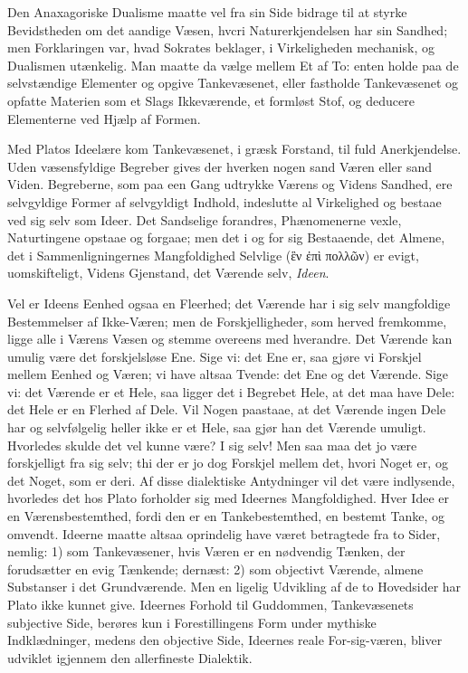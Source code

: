 \documentclass[12pt,a4paper]{book}
\begin{document}
Den Anaxagoriske Dualisme maatte vel fra sin Side bidrage til at styrke
Bevidstheden om det aandige Væsen, hvcri Naturerkjendelsen har sin Sandhed;
men Forklaringen var, hvad Sokrates beklager, i Virkeligheden mechanisk, og
Dualismen utænkelig. Man maatte da vælge mellem Et af To: enten holde paa de
selvstændige Elementer og opgive Tankevæsenet, eller fastholde Tankevæsenet og
opfatte Materien som et Slags Ikkeværende, et formløst Stof, og deducere
Elementerne ved Hjælp af Formen.

Med Platos Ideelære kom Tankevæsenet, i græsk Forstand, til fuld
Anerkjendelse. Uden væsensfyldige Begreber gives der hverken nogen sand Væren
eller sand Viden. Begreberne, som paa een Gang udtrykke Værens og Videns
Sandhed, ere selvgyldige Former af selvgyldigt Indhold, indeslutte al
Virkelighed og bestaae ved sig selv som Ideer. Det Sandselige forandres,
Phænomenerne vexle, Naturtingene opstaae og forgaae; men det i og for sig
Bestaaende, det Almene, det i Sammenligningernes Mangfoldighed Selvlige
(ἓν ἐπὶ πολλῶν) er evigt, uomskifteligt, Videns Gjenstand, det Værende selv,
\emph{Ideen}.

Vel er Ideens Eenhed ogsaa en Fleerhed; det Værende har i sig selv
mangfoldige Bestemmelser af Ikke-Væren; men de Forskjelligheder, som herved
fremkomme, ligge alle i Værens Væsen og stemme overeens med hverandre. Det
Værende kan umulig være det forskjelsløse Ene. Sige vi: det Ene er, saa gjøre
vi Forskjel mellem Eenhed og Væren; vi have altsaa Tvende: det Ene og det
Værende. Sige vi: det Værende er et Hele, saa ligger det i Begrebet Hele, at
det maa have Dele: det Hele er en Flerhed af Dele. Vil Nogen paastaae, at det
Værende ingen Dele har og selvfølgelig heller ikke er et Hele, saa gjør han
det Værende umuligt. Hvorledes skulde det vel kunne være? I sig selv! Men saa
maa det jo være forskjelligt fra sig selv; thi der er jo dog Forskjel mellem
det, hvori Noget er, og det Noget, som er deri. Af disse dialektiske
Antydninger vil det være indlysende, hvorledes det hos Plato forholder sig med
Ideernes Mangfoldighed. Hver Idee er en Værensbestemthed, fordi den er en
Tankebestemthed, en bestemt Tanke, og omvendt. Ideerne maatte altsaa
oprindelig have været betragtede fra to Sider, nemlig: 1) som Tankevæsener,
hvis Væren er en nødvendig Tænken, der forudsætter en evig Tænkende; dernæst:
2) som objectivt Værende, almene Substanser i det Grundværende. Men en ligelig
Udvikling af de to Hovedsider har Plato ikke kunnet give. Ideernes Forhold til
Guddommen, Tankevæsenets subjective Side, berøres kun i Forestillingens Form
under mythiske Indklædninger, medens den objective Side, Ideernes reale
For-sig-væren, bliver udviklet igjennem den allerfineste Dialektik.
\end{document}
